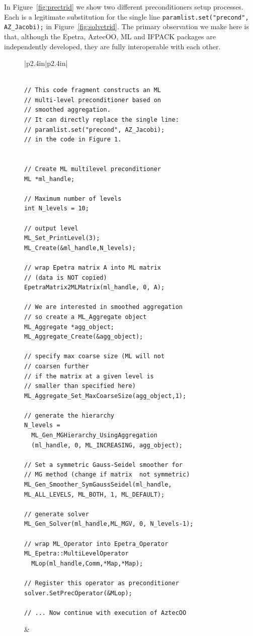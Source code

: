 \documentclass[12pt,relax]{TPA}
\begin{document}
In Figure~\ref{fig:prectrid} we show two different preconditioners
setup processes.  Each is a legitimate substitution for the single
line {\tt paramlist.set("precond", AZ\_Jacobi);} in
Figure~\ref{fig:solvetrid}.  The primary observation we make here is
that, although the Epetra, AztecOO, ML and IFPACK packages are
independently developed, they are fully interoperable with each other.
\begin{figure}
{\scriptsize
\begin{tabular}{|p{2.4in}|p{2.4in}|}\hline
\begin{verbatim}

// This code fragment constructs an ML
// multi-level preconditioner based on 
// smoothed aggregation.
// It can directly replace the single line:
// paramlist.set("precond", AZ_Jacobi);
// in the code in Figure 1.


// Create ML multilevel preconditioner
ML *ml_handle;

// Maximum number of levels 
int N_levels = 10;

// output level
ML_Set_PrintLevel(3);
ML_Create(&ml_handle,N_levels);

// wrap Epetra matrix A into ML matrix 
// (data is NOT copied)
EpetraMatrix2MLMatrix(ml_handle, 0, A);

// We are interested in smoothed aggregation
// so create a ML_Aggregate object
ML_Aggregate *agg_object;
ML_Aggregate_Create(&agg_object);

// specify max coarse size (ML will not 
// coarsen further 
// if the matrix at a given level is
// smaller than specified here)
ML_Aggregate_Set_MaxCoarseSize(agg_object,1);

// generate the hierarchy
N_levels = 
  ML_Gen_MGHierarchy_UsingAggregation
  (ml_handle, 0, ML_INCREASING, agg_object);

// Set a symmetric Gauss-Seidel smoother for 
// MG method (change if matrix  not symmetric)
ML_Gen_Smoother_SymGaussSeidel(ml_handle, 
ML_ALL_LEVELS, ML_BOTH, 1, ML_DEFAULT);

// generate solver
ML_Gen_Solver(ml_handle,ML_MGV, 0, N_levels-1);

// wrap ML_Operator into Epetra_Operator
ML_Epetra::MultiLevelOperator  
  MLop(ml_handle,Comm,*Map,*Map);

// Register this operator as preconditioner
solver.SetPrecOperator(&MLop);

// ... Now continue with execution of AztecOO
\end{verbatim}
&
\begin{verbatim}


\end{verbatim}
\end{tabular}}
\end{figure}
\end{document}
